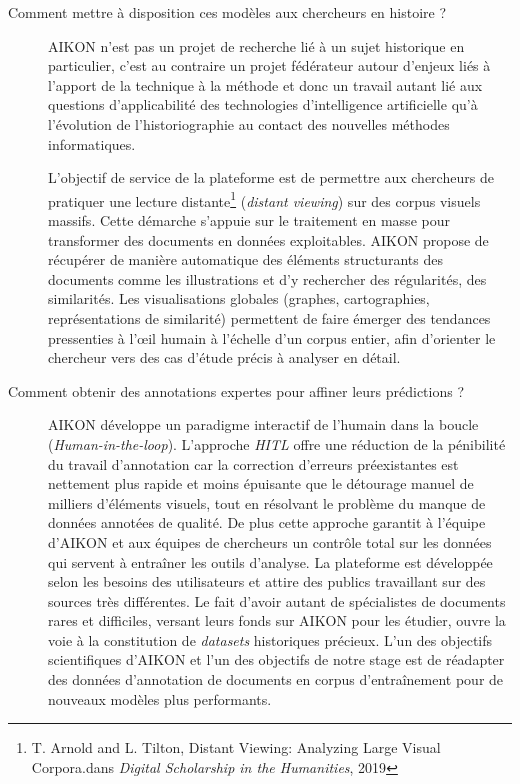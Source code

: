 \begin{description}
\item[Comment mettre à disposition ces modèles aux chercheurs en histoire ?] AIKON n'est pas un projet de recherche lié à un sujet historique en particulier, c'est au contraire un projet fédérateur autour d'enjeux liés à l'apport de la technique à la méthode et donc un travail autant lié aux questions d'applicabilité des technologies d'intelligence artificielle qu'à l'évolution de l'historiographie au contact des nouvelles méthodes informatiques. 

L'objectif de service de la plateforme est de permettre aux chercheurs de pratiquer une lecture distante\footnote{T. Arnold and L. Tilton, \og Distant Viewing: Analyzing Large Visual Corpora.\fg dans \textit{Digital Scholarship in the Humanities}, 2019} (\textit{distant viewing}) sur des corpus visuels massifs. Cette démarche s'appuie sur le traitement en masse pour transformer des documents en données exploitables. AIKON propose de récupérer de manière automatique des éléments structurants des documents comme les illustrations et d'y rechercher des régularités, des similarités. Les visualisations globales (graphes, cartographies, représentations de similarité) permettent de faire émerger des tendances pressenties à l'œil humain à l'échelle d'un corpus entier, afin d'orienter le chercheur vers des cas d'étude précis à analyser en détail.

\item[Comment obtenir des annotations expertes pour affiner leurs prédictions ?] AIKON développe un paradigme interactif de \og l'humain dans la boucle \fg   (\textit{Human-in-the-loop}). L'approche \textit{HITL} offre une réduction de la pénibilité du travail d'annotation car la correction d'erreurs préexistantes est nettement plus rapide et moins épuisante que le détourage manuel de milliers d'éléments visuels, tout en résolvant le problème du manque de données annotées de qualité. De plus cette approche garantit à l'équipe d'AIKON et aux équipes de chercheurs un contrôle total sur les données qui servent à entraîner les outils d'analyse. La plateforme est développée selon les besoins des utilisateurs et attire des publics travaillant sur des sources très différentes. Le fait d'avoir autant de spécialistes de documents rares et difficiles, versant leurs fonds sur AIKON pour les étudier, ouvre la voie à la constitution de \textit{datasets} historiques précieux. L'un des objectifs scientifiques d'AIKON et l'un des objectifs de notre stage est de réadapter des données d'annotation de documents en corpus d'entraînement pour de nouveaux modèles plus performants.
\end{description}

